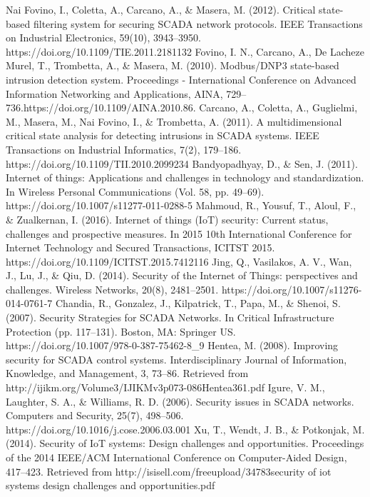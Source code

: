 \documentclass[letterpaper, 10 pt, conference]{ieeeconf}  %
\begin{document}
\begin{thebibliography}{99}
 Nai Fovino, I., Coletta, A., Carcano, A., \& Masera, M. (2012). Critical state-based filtering system for securing SCADA network protocols. IEEE Transactions on Industrial Electronics, 59(10), 3943–3950. https://doi.org/10.1109/TIE.2011.2181132
 Fovino, I. N., Carcano, A., De Lacheze Murel, T., Trombetta, A., \& Masera, M. (2010). Modbus/DNP3 state-based intrusion detection system. Proceedings - International Conference on Advanced Information Networking and Applications, AINA, 729–736.https://doi.org/10.1109/AINA.2010.86.
 Carcano, A., Coletta, A., Guglielmi, M., Masera, M., Nai Fovino, I., \& Trombetta, A. (2011). A multidimensional critical state analysis for detecting intrusions in SCADA systems. IEEE Transactions on Industrial Informatics, 7(2), 179–186. https://doi.org/10.1109/TII.2010.2099234
 Bandyopadhyay, D., \& Sen, J. (2011). Internet of things: Applications and challenges in technology and standardization. In Wireless Personal Communications (Vol. 58, pp. 49–69). https://doi.org/10.1007/s11277-011-0288-5
 Mahmoud, R., Yousuf, T., Aloul, F., \& Zualkernan, I. (2016). Internet of things (IoT) security: Current status, challenges and prospective measures. In 2015 10th International Conference for Internet Technology and Secured Transactions, ICITST 2015. https://doi.org/10.1109/ICITST.2015.7412116
Jing, Q., Vasilakos, A. V., Wan, J., Lu, J., \& Qiu, D. (2014). Security of the Internet of Things: perspectives and challenges. Wireless Networks, 20(8), 2481–2501. https://doi.org/10.1007/s11276-014-0761-7
 Chandia, R., Gonzalez, J., Kilpatrick, T., Papa, M., \& Shenoi, S. (2007). Security Strategies for SCADA Networks. In Critical Infrastructure Protection (pp. 117–131). Boston, MA: Springer US. https://doi.org/10.1007/978-0-387-75462-8\_9
 Hentea, M. (2008). Improving security for SCADA control systems. Interdisciplinary Journal of Information, Knowledge, and Management, 3, 73–86. Retrieved from http://ijikm.org/Volume3/IJIKMv3p073-086Hentea361.pdf
 Igure, V. M., Laughter, S. A., \& Williams, R. D. (2006). Security issues in SCADA networks. Computers and Security, 25(7), 498–506. https://doi.org/10.1016/j.cose.2006.03.001
Xu, T., Wendt, J. B., \& Potkonjak, M. (2014). Security of IoT systems: Design challenges and opportunities. Proceedings of the 2014 IEEE/ACM International Conference on Computer-Aided Design, 417–423. Retrieved from http://isisell.com/freeupload/34783security of iot systems design challenges and opportunities.pdf

\end{thebibliography}
\end{document}
